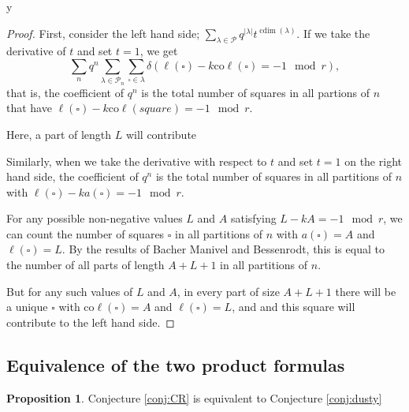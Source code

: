 y\documentclass{amsart}[12pt]
\theoremstyle{definition}
\newtheorem{proposition}[dummy]{Proposition}
\newcommand{\PP}{\mathcal{P}} %
\newcommand{\coleg}{\text{co}\ell}
\DeclareMathOperator{\cdim}{cdim}
\begin{document}
\begin{proof}
First, consider the left hand side; $\sum_{\lambda\in\PP} q^{|\lambda|} t^{\cdim(\lambda)}$.  If we take the derivative of $t$ and set $t=1$, we get 
$$\sum_{n} q^n\sum_{\lambda\in\PP_n}\sum_{\square\in\lambda} \delta(\ell(\square)-k\coleg(\square)=-1\mod r),$$
that is, the coefficient of $q^n$ is the total number of squares in all partions of $n$ that have $\ell(\square)-k\coleg(square)=-1\mod r$.  

  Here, a part of length $L$ will contribute 

Similarly, when we take the derivative with respect to $t$ and set $t=1$ on the right hand side, the coefficient of $q^n$ is the total number of squares in all partitions of $n$ with $\ell(\square)-k a(\square)=-1\mod r$. 

For any possible non-negative values $L$ and $A$ satisfying $L-kA=-1\mod r$, we can count the number of squares $\square$ in all partitions of $n$ with $a(\square)=A$ and $\ell(\square)=L$.  By the results of Bacher Manivel and Bessenrodt, this is equal to the number of all parts of length $A+L+1$ in all partitions of $n$.  

But for any such values of $L$ and $A$, in every part of size $A+L+1$ there will be a unique $\square$ with $\coleg(\square)=A$ and $\ell(\square)=L$, and and this square will contribute to the left hand side.


\end{proof}



\subsection{Equivalence of the two product formulas}
\label{sec:prod-equiv}

\begin{proposition}
Conjecture \ref{conj:CR} is equivalent to Conjecture \ref{conj:dusty}
\end{proposition}
\end{document}
